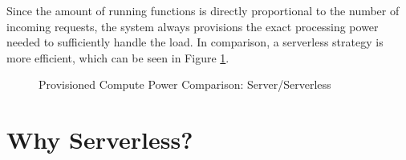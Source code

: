 Since the amount of running functions is directly proportional to the number of incoming requests, the system always provisions the exact processing power needed to sufficiently handle the load. In comparison, a serverless strategy is more efficient, which can be seen in Figure \ref{graph:provisionedComputePowerComparison}.

\begin{figure}[ht]
    \centering
    \caption {Provisioned Compute Power Comparison: Server/Serverless}
    \label{graph:provisionedComputePowerComparison}
\end{figure}

\section{Why Serverless?}

